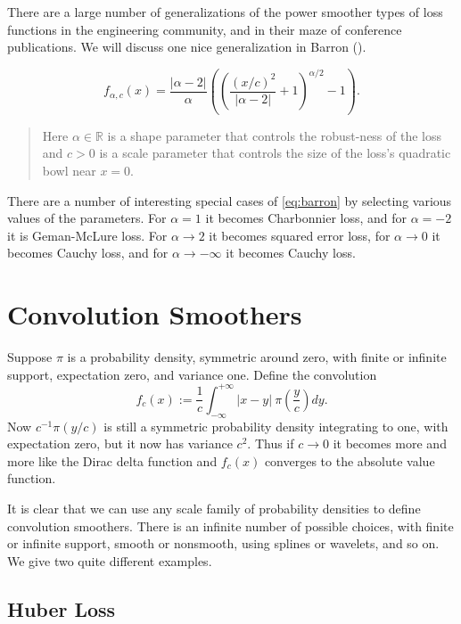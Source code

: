 \documentclass[
  12pt,
  letterpaper,
  DIV=11,
  numbers=noendperiod]{scrartcl}
\newcommand{\sectionbreak}{\pagebreak}
\theoremstyle{plain}
\theoremstyle{remark}
\begin{document}
There are a large number of generalizations of the power smoother types
of loss functions in the engineering community, and in their maze of
conference publications. We will discuss one nice generalization in
Barron ().

\begin{equation}
f_{\alpha,c}(x)=\frac{|\alpha-2|}{\alpha}\left(\left(\frac{(x/c)^2}{|\alpha-2|}+1\right)^{\alpha/2}-1\right).\label{eq:barron}
\end{equation}

\begin{quote}
Here \(\alpha\in\mathbb{R}\) is a shape parameter that controls the
robust-ness of the loss and \(c>0\) is a scale parameter that controls
the size of the loss's quadratic bowl near \(x=0\).
\end{quote}

There are a number of interesting special cases of \eqref{eq:barron} by
selecting various values of the parameters. For \(\alpha=1\) it becomes
Charbonnier loss, and for \(\alpha=-2\) it is Geman-McLure loss. For
\(\alpha\rightarrow 2\) it becomes squared error loss, for
\(\alpha\rightarrow 0\) it becomes Cauchy loss, and for
\(\alpha\rightarrow-\infty\) it becomes Cauchy loss.

\sectionbreak

\section{Convolution Smoothers}\label{convolution-smoothers}

Suppose \(\pi\) is a probability density, symmetric around zero, with
finite or infinite support, expectation zero, and variance one. Define
the convolution \[
f_c(x):=\frac{1}{c}\int_{-\infty}^{+\infty}|x-y|\ \pi(\frac{y}{c})dy.
\] Now \(c^{-1}\pi(y/c)\) is still a symmetric probability density
integrating to one, with expectation zero, but it now has variance
\(c^2\). Thus if \(c\rightarrow 0\) it becomes more and more like the
Dirac delta function and \(f_c(x)\) converges to the absolute value
function.

It is clear that we can use any scale family of probability densities to
define convolution smoothers. There is an infinite number of possible
choices, with finite or infinite support, smooth or nonsmooth, using
splines or wavelets, and so on. We give two quite different examples.

\subsection{Huber Loss}\label{huber-loss}
\end{document}
